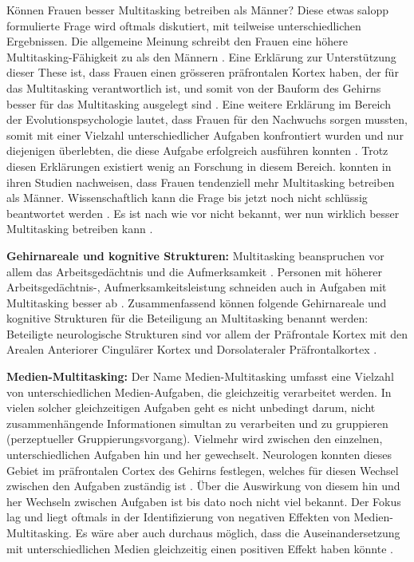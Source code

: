 Können Frauen besser Multitasking betreiben als Männer? Diese etwas salopp formulierte Frage wird oftmals diskutiert, mit teilweise unterschiedlichen Ergebnissen. Die allgemeine Meinung schreibt den Frauen eine höhere Multitasking-Fähigkeit zu als den Männern \cite{Oconnell2002}. Eine Erklärung zur Unterstützung dieser These ist, dass Frauen einen grösseren präfrontalen Kortex haben, der für das Multitasking verantwortlich ist, und somit von der Bauform des Gehirns besser für das Multitasking ausgelegt sind \cite{Fisher2000}. Eine weitere Erklärung im Bereich der Evolutionspsychologie lautet, dass Frauen für den Nachwuchs sorgen mussten, somit mit einer Vielzahl unterschiedlicher Aufgaben konfrontiert wurden und nur diejenigen überlebten, die diese Aufgabe erfolgreich ausführen konnten \cite{Ellison2006}. Trotz diesen Erklärungen existiert wenig an Forschung in diesem Bereich.  konnten in ihren Studien nachweisen, dass Frauen tendenziell mehr Multitasking betreiben als Männer. Wissenschaftlich kann die Frage bis jetzt noch nicht schlüssig beantwortet werden \cite{Foehr2006}. Es ist nach wie vor nicht bekannt, wer nun wirklich besser Multitasking betreiben kann \cite{Mahany2005, Klingberg2008}. 
\par  
\textbf{Gehirnareale und kognitive Strukturen:} Multitasking beanspruchen vor allem das Arbeitsgedächtnis und die Aufmerksamkeit \cite{Baethge2013}. Personen mit höherer Arbeitsgedächtnis-, Aufmerksamkeitsleistung schneiden auch in Aufgaben mit Multitasking besser ab \cite{Buhner2006}. Zusammenfassend können folgende Gehirnareale und kognitive Strukturen für die Beteiligung an Multitasking benannt werden: Beteiligte neurologische Strukturen sind vor allem der Präfrontale Kortex mit den Arealen Anteriorer Cingulärer Kortex und Dorsolateraler Präfrontalkortex \cite{Dreher2003}.
\par
\textbf{Medien-Multitasking:} Der Name Medien-Multitasking umfasst eine Vielzahl von unterschiedlichen Medien-Aufgaben, die gleichzeitig verarbeitet werden. In vielen solcher gleichzeitigen Aufgaben geht es nicht unbedingt darum, nicht zusammenhängende Informationen simultan zu verarbeiten und zu gruppieren (perzeptueller Gruppierungsvorgang). Vielmehr wird zwischen den einzelnen, unterschiedlichen Aufgaben hin und her gewechselt. Neurologen konnten dieses Gebiet im präfrontalen Cortex des Gehirns festlegen, welches für diesen Wechsel zwischen den Aufgaben zuständig ist \cite{Wallis2006, Wood2003}. Über die Auswirkung von diesem hin und her Wechseln zwischen Aufgaben ist bis dato noch nicht viel bekannt. Der Fokus lag und liegt oftmals in der Identifizierung von negativen Effekten von Medien-Multitasking. Es wäre aber auch durchaus möglich, dass die Auseinandersetzung mit unterschiedlichen Medien gleichzeitig einen positiven Effekt haben könnte \cite{Foehr2006}.   

